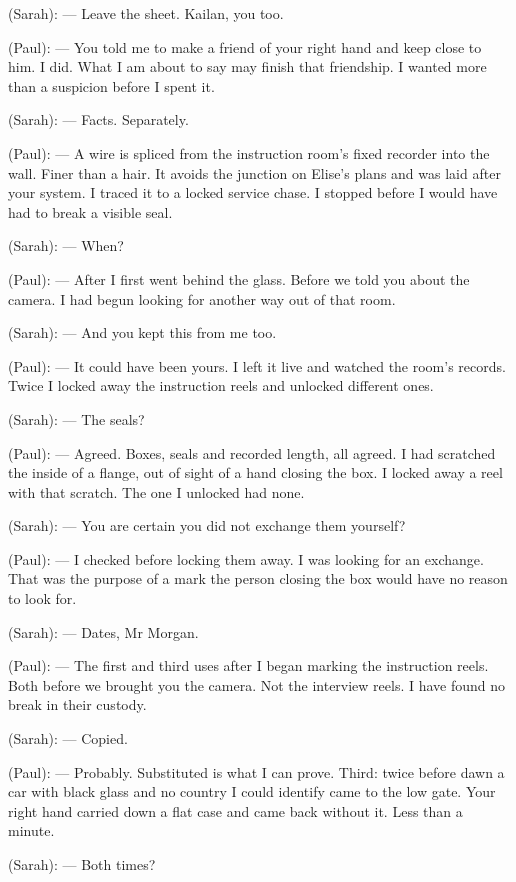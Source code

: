 \begin{room}
(Sarah): --- Leave the sheet. Kailan, you too.

\centerline{}

(Paul): --- You told me to make a friend of your right hand and keep close to him. I did. What I am about to say may finish that friendship. I wanted more than a suspicion before I spent it.

(Sarah): --- Facts. Separately.

(Paul): --- A wire is spliced from the instruction room's fixed recorder into the wall. Finer than a hair. It avoids the junction on Elise's plans and was laid after your system. I traced it to a locked service chase. I stopped before I would have had to break a visible seal.

(Sarah): --- When?

(Paul): --- After I first went behind the glass. Before we told you about the camera. I had begun looking for another way out of that room.

(Sarah): --- And you kept this from me too.

(Paul): --- It could have been yours. I left it live and watched the room's records. Twice I locked away the instruction reels and unlocked different ones.

(Sarah): --- The seals?

(Paul): --- Agreed. Boxes, seals and recorded length, all agreed. I had scratched the inside of a flange, out of sight of a hand closing the box. I locked away a reel with that scratch. The one I unlocked had none.

(Sarah): --- You are certain you did not exchange them yourself?

(Paul): --- I checked before locking them away. I was looking for an exchange. That was the purpose of a mark the person closing the box would have no reason to look for.

(Sarah): --- Dates, Mr Morgan.

(Paul): --- The first and third uses after I began marking the instruction reels. Both before we brought you the camera. Not the interview reels. I have found no break in their custody.

(Sarah): --- Copied.

(Paul): --- Probably. Substituted is what I can prove. Third: twice before dawn a car with black glass and no country I could identify came to the low gate. Your right hand carried down a flat case and came back without it. Less than a minute.

(Sarah): --- Both times?


\end{room}
